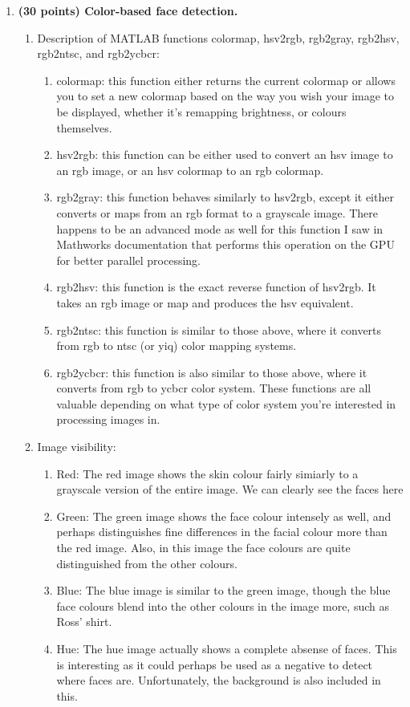 \documentclass[10pt]{article}
\begin{document}
\begin{enumerate}
\item \textbf{(30 points) Color-based face detection.}
\begin{enumerate}
\item Description of MATLAB functions colormap, hsv2rgb, rgb2gray, rgb2hsv, rgb2ntsc, and rgb2ycbcr:
\begin{enumerate}
\item colormap: this function either returns the current colormap or allows you to set a new colormap based on the way you wish your image to be displayed, whether it's remapping brightness, or colours themselves.
\item hsv2rgb: this function can be either used to convert an hsv image to an rgb image, or an hsv colormap to an rgb colormap.
\item rgb2gray: this function behaves similarly to hsv2rgb, except it either converts or maps from an rgb format to a grayscale image. There happens to be an advanced mode as well for this function I saw in Mathworks documentation that performs this operation on the GPU for better parallel processing.
\item rgb2hsv: this function is the exact reverse function of hsv2rgb. It takes an rgb image or map and produces the hsv equivalent.
\item rgb2ntsc: this function is similar to those above, where it converts from rgb to ntsc (or yiq) color mapping systems.
\item rgb2ycbcr: this function is also similar to those above, where it converts from rgb to ycbcr color system. These functions are all valuable depending on what type of color system you're interested in processing images in.
\end{enumerate}
\item Image visibility:
\begin{enumerate}
\item Red: The red image shows the skin colour fairly simiarly to a grayscale version of the entire image. We can clearly see the faces here
\item Green: The green image shows the face colour intensely as well, and perhaps distinguishes fine differences in the facial colour more than the red image. Also, in this image the face colours are quite distinguished from the other colours.
\item Blue: The blue image is similar to the green image, though the blue face colours blend into the other colours in the image more, such as Ross' shirt.
\item Hue: The hue image actually shows a complete absense of faces. This is interesting as it could perhaps be used as a negative to detect where faces are. Unfortunately, the background is also included in this.

\end{enumerate}
\end{enumerate}
\end{enumerate}
\end{document}
